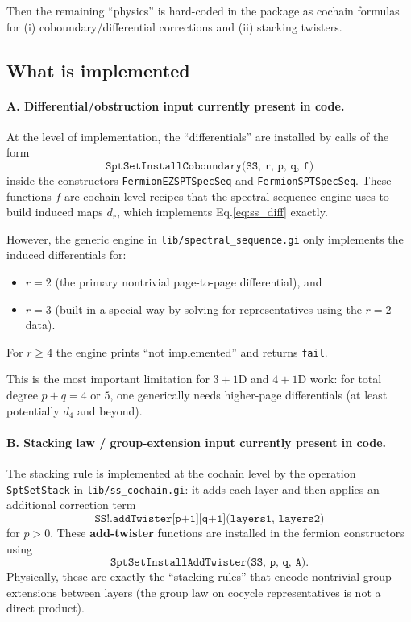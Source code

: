 \documentclass{SciPost}
\begin{document}
Then the remaining ``physics'' is hard-coded in the package as cochain formulas for (i) coboundary/differential corrections and (ii) stacking twisters.

\subsection{What is implemented}

\paragraph{A. Differential/obstruction input currently present in code.}

At the level of implementation, the ``differentials'' are installed by calls of the form
\begin{equation}
	\texttt{SptSetInstallCoboundary(SS, r, p, q, f)}
\end{equation}
inside the constructors \texttt{FermionEZSPTSpecSeq} and \texttt{FermionSPTSpecSeq}.
These functions $f$ are cochain-level recipes that the spectral-sequence engine uses to build induced maps $d_r$, which implements Eq.\eqref{eq:ss_diff} exactly.

However, the generic engine in \texttt{lib/spectral\_sequence.gi} only implements the induced differentials for:
\begin{itemize}
    \item $r=2$ (the primary nontrivial page-to-page differential), and
    \item $r=3$ (built in a special way by solving for representatives using the $r=2$ data).
\end{itemize}
For $r\ge 4$ the engine prints ``not implemented'' and returns \texttt{fail}.

This is the most important limitation for $3{+}1$D and $4{+}1$D work: for total degree $p+q=4$ or $5$, one generically needs higher-page differentials (at least potentially $d_4$ and beyond).

\paragraph{B. Stacking law / group-extension input currently present in code.}

The stacking rule is implemented at the cochain level by the operation \texttt{SptSetStack} in \texttt{lib/ss\_cochain.gi}:
it adds each layer and then applies an additional correction term
\begin{equation}
	\texttt{SS!.addTwister[p+1][q+1](layers1, layers2)}
\end{equation}
for $p>0$.
These \textbf{add-twister} functions are installed in the fermion constructors using
\begin{equation}
	\texttt{SptSetInstallAddTwister(SS, p, q, A)}.
\end{equation}
Physically, these are exactly the ``stacking rules'' that encode nontrivial group extensions between layers (the group law on cocycle representatives is not a direct product).
\end{document}
